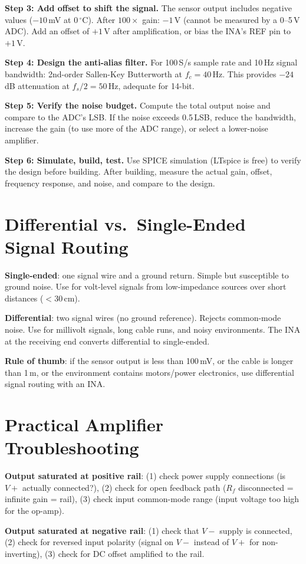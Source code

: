 \documentclass[11pt,letterpaper,twoside,openany]{book}
\newcommand{\degC}{\ensuremath{{}^{\circ}\text{C}}}
\begin{document}
\textbf{Step 3: Add offset to shift the signal.} The sensor output includes negative values ($-10$\,mV at 0\,\degC{}). After $100\times$ gain: $-1$\,V (cannot be measured by a 0--5\,V ADC). Add an offset of $+1$\,V after amplification, or bias the INA's REF pin to $+1$\,V.

\textbf{Step 4: Design the anti-alias filter.} For 100\,S/s sample rate and 10\,Hz signal bandwidth: 2nd-order Sallen-Key Butterworth at $f_c = 40$\,Hz. This provides $-24$\,dB attenuation at $f_s/2 = 50$\,Hz, adequate for 14-bit.

\textbf{Step 5: Verify the noise budget.} Compute the total output noise and compare to the ADC's LSB. If the noise exceeds 0.5\,LSB, reduce the bandwidth, increase the gain (to use more of the ADC range), or select a lower-noise amplifier.

\textbf{Step 6: Simulate, build, test.} Use SPICE simulation (LTspice is free) to verify the design before building. After building, measure the actual gain, offset, frequency response, and noise, and compare to the design.

\section{Differential vs.\ Single-Ended Signal Routing}
\textbf{Single-ended}: one signal wire and a ground return. Simple but susceptible to ground noise. Use for volt-level signals from low-impedance sources over short distances ($<$30\,cm).

\textbf{Differential}: two signal wires (no ground reference). Rejects common-mode noise. Use for millivolt signals, long cable runs, and noisy environments. The INA at the receiving end converts differential to single-ended.

\textbf{Rule of thumb}: if the sensor output is less than 100\,mV, or the cable is longer than 1\,m, or the environment contains motors/power electronics, use differential signal routing with an INA.
\section{Practical Amplifier Troubleshooting}
\textbf{Output saturated at positive rail}: (1) check power supply connections (is $V+$ actually connected?), (2) check for open feedback path ($R_f$ disconnected = infinite gain = rail), (3) check input common-mode range (input voltage too high for the op-amp).

\textbf{Output saturated at negative rail}: (1) check that $V-$ supply is connected, (2) check for reversed input polarity (signal on $V-$ instead of $V+$ for non-inverting), (3) check for DC offset amplified to the rail.
\end{document}
